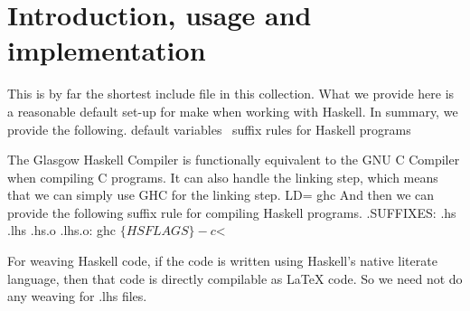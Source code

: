 \section{Introduction, usage and implementation}%

This is by far the shortest include file in this collection.
What we provide here is a reasonable default set-up for make when working with 
Haskell.
In summary, we provide the following.
\endmoddef\nwstartdeflinemarkup\nwenddeflinemarkup
\LA{}default variables~{\nwtagstyle{}}\RA{}
\LA{}suffix rules for Haskell programs~{\nwtagstyle{}}\RA{}
\nwendcode{}\nwdocspar

The Glasgow Haskell Compiler is functionally equivalent to the GNU C Compiler 
when compiling C programs.
It can also handle the linking step, which means that we can simply use GHC for
the linking step.
\nwenddocs{}\endmoddef\nwstartdeflinemarkup{}\nwenddeflinemarkup
LD=   ghc
\nwendcode{}And then we can provide the following suffix rule for compiling Haskell 
programs.
\nwenddocs{}\endmoddef\nwstartdeflinemarkup{}\nwenddeflinemarkup
.SUFFIXES: .hs .lhs
.hs.o .lhs.o:
  ghc $\{HSFLAGS\} -c $<
\nwendcode{}

%
%
%
\nwdocspar

For weaving Haskell code, if the code is written using Haskell's native 
literate language, then that code is directly compilable as LaTeX code.
So we need not do any weaving for {\Tt{}.lhs\nwendquote} files.

\nwenddocs{}
